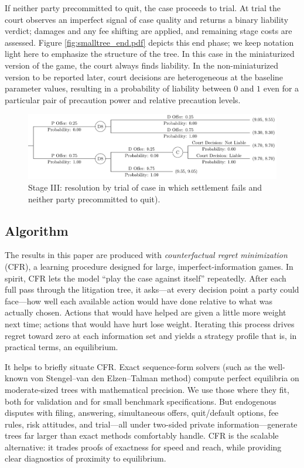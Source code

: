 \documentclass{article}
\begin{document}
If neither party precommitted to quit, the case proceeds to trial. At trial the court observes an imperfect signal of case quality and returns a binary liability verdict; damages and any fee shifting are applied, and remaining stage costs are assessed. Figure \ref{fig:smalltree_end.pdf} depicts this end phase; we keep notation light here to emphasize the structure of the tree. In this case in the miniaturized version of the game, the court always finds liability. In the non-miniaturized version to be reported later, court decisions are heterogeneous at the baseline parameter values, resulting in a probability of liability between $0$ and $1$ even for a particular pair of precaution power and relative precaution levels. 

  \begin{figure}[t]
    \centering
    \includegraphics[width=\textwidth]{../Figures/smalltree_end_adjudication.pdf}
    \caption{Stage III: resolution by trial of case in which settlement fails and neither party precommitted to quit).}
    \label{fig:smalltree_end_adjudication.pdf}
  \end{figure}

\subsection{Algorithm}

The results in this paper are produced with \emph{counterfactual regret minimization} (CFR), a learning procedure designed for large, imperfect-information games. In spirit, CFR lets the model “play the case against itself” repeatedly. After each full pass through the litigation tree, it asks—at every decision point a party could face—how well each available action would have done relative to what was actually chosen. Actions that would have helped are given a little more weight next time; actions that would have hurt lose weight. Iterating this process drives regret toward zero at each information set and yields a strategy profile that is, in practical terms, an equilibrium.

It helps to briefly situate CFR. Exact sequence-form solvers (such as the well-known von Stengel–van den Elzen–Talman method) compute perfect equilibria on moderate-sized trees with mathematical precision. We use those where they fit, both for validation and for small benchmark specifications. But endogenous disputes with filing, answering, simultaneous offers, quit/default options, fee rules, risk attitudes, and trial—all under two-sided private information—generate trees far larger than exact methods comfortably handle. CFR is the scalable alternative: it trades proofs of exactness for speed and reach, while providing clear diagnostics of proximity to equilibrium.
\end{document}
